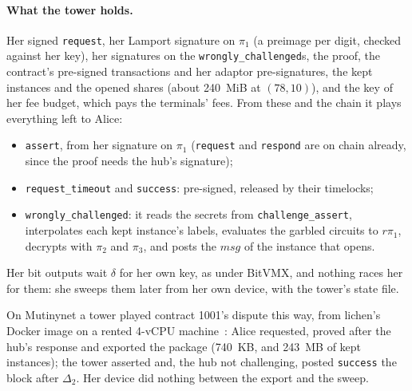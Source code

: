 \documentclass[11pt]{article}
\newcommand{\tx}[1]{\texttt{#1}}
\begin{document}
\paragraph{What the tower holds.} Her signed \tx{request}, her Lamport
signature on $\pi_1$ (a preimage per digit, checked against her key),
her signatures on the \tx{wrongly\_challenged}s, the proof, the
contract's pre-signed transactions and her adaptor pre-signatures, the
kept instances and the opened shares (about 240~MiB at $(78, 10)$), and
the key of her fee budget, which pays the terminals' fees. From these
and the chain it plays everything left to Alice:
\begin{itemize}[leftmargin=1.5em]
\item \tx{assert}, from her signature on $\pi_1$ (\tx{request} and
  \tx{respond} are on chain already, since the proof needs the hub's
  signature);
\item \tx{request\_timeout} and \tx{success}: pre-signed, released by
  their timelocks;
\item \tx{wrongly\_challenged}: it reads the secrets from
  \tx{challenge\_assert}, interpolates each kept instance's labels,
  evaluates the garbled circuits to $r\pi_1$, decrypts with $\pi_2$ and
  $\pi_3$, and posts the $\mathit{msg}$ of the instance that opens.
\end{itemize}
Her bit outputs wait $\delta$ for her own key, as under BitVMX, and
nothing races her for them: she sweeps them later from her own device,
with the tower's state file.

On Mutinynet a tower played contract 1001's dispute this way, from
lichen's Docker image on a rented 4-vCPU machine~\cite{explainers}:
Alice requested, proved after the hub's response and exported the
package (740~KB, and 243~MB of kept instances); the tower asserted and,
the hub not challenging, posted \tx{success} the block after $\Delta_2$.
Her device did nothing between the export and the sweep.
\end{document}
